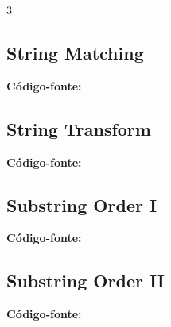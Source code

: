 \documentclass[8pt]{extarticle}
\begin{document}
\begin{multicols*}{3}
\subsection{String Matching}
\begin{caixaenunciado}

\end{caixaenunciado}
\vspace{0.3cm}
\noindent\textbf{Código-fonte:}


\subsection{String Transform}
\begin{caixaenunciado}

\end{caixaenunciado}
\vspace{0.3cm}
\noindent\textbf{Código-fonte:}


\subsection{Substring Order I}
\begin{caixaenunciado}

\end{caixaenunciado}
\vspace{0.3cm}
\noindent\textbf{Código-fonte:}


\subsection{Substring Order II}
\begin{caixaenunciado}

\end{caixaenunciado}
\vspace{0.3cm}
\noindent\textbf{Código-fonte:}

\end{multicols*}
\pagebreak
\end{document}
